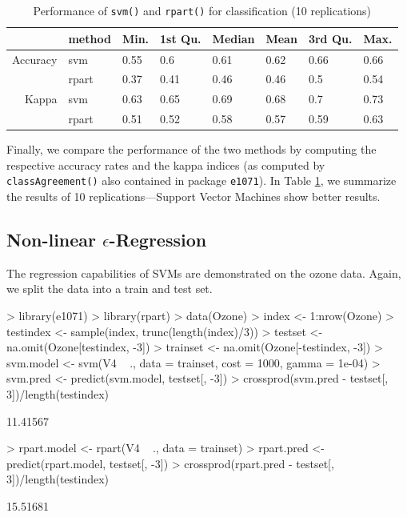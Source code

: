 \documentclass[a4paper]{article}
\newcommand{\pkg}[1]{\texttt{#1}}
\begin{document}

\begin{table}[ht]
\begin{center}
\begin{tabular}{rlllllll}
\hline
 & method & Min. & 1st Qu. & Median & Mean & 3rd Qu. & Max. \\
\hline
Accuracy &   svm & 0.55 &  0.6 & 0.61 & 0.62 & 0.66 & 0.66 \\
 & rpart & 0.37 & 0.41 & 0.46 & 0.46 &  0.5 & 0.54 \\
Kappa &   svm & 0.63 & 0.65 & 0.69 & 0.68 &  0.7 & 0.73 \\
  & rpart & 0.51 & 0.52 & 0.58 & 0.57 & 0.59 & 0.63 \\
\hline
\end{tabular}
\caption{Performance of \texttt{svm()} and
       \texttt{rpart()} for classification (10 replications)}
\label{tab:class}
\end{center}
\end{table}\noindent Finally, we compare the performance of the two methods by computing the 
respective accuracy rates and the kappa indices (as computed by \texttt{classAgreement()}
also contained in package \pkg{e1071}). In Table \ref{tab:class}, we
summarize the results of 10 replications---Support Vector Machines show better results.

\subsection*{Non-linear $\epsilon$-Regression}

The regression capabilities of SVMs are demonstrated on the
ozone data. Again, we split the data
into a train and test set.

\begin{Schunk}
\begin{Sinput}
> library(e1071)
> library(rpart)
> data(Ozone)
> index <- 1:nrow(Ozone)
> testindex <- sample(index, trunc(length(index)/3))
> testset <- na.omit(Ozone[testindex, -3])
> trainset <- na.omit(Ozone[-testindex, -3])
> svm.model <- svm(V4 ~ ., data = trainset, cost = 1000, gamma = 1e-04)
> svm.pred <- predict(svm.model, testset[, -3])
> crossprod(svm.pred - testset[, 3])/length(testindex)
\end{Sinput}
\begin{Soutput}
         [,1]
[1,] 11.41567
\end{Soutput}
\begin{Sinput}
> rpart.model <- rpart(V4 ~ ., data = trainset)
> rpart.pred <- predict(rpart.model, testset[, -3])
> crossprod(rpart.pred - testset[, 3])/length(testindex)
\end{Sinput}
\begin{Soutput}
         [,1]
[1,] 15.51681
\end{Soutput}
\end{Schunk}
\end{document}
